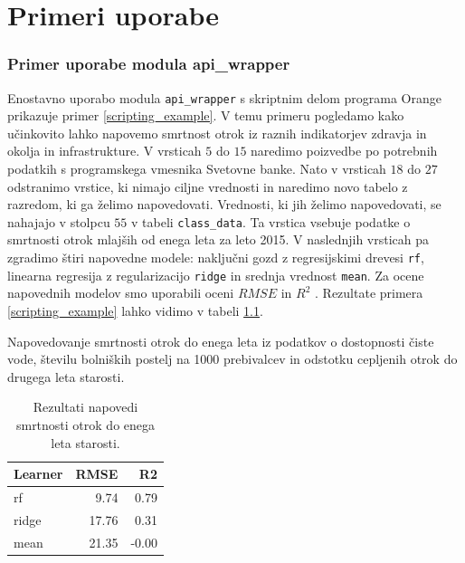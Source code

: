\chapter{Primeri uporabe}




\subsection{Primer uporabe modula api\_wrapper}

Enostavno uporabo modula \verb|api_wrapper| s skriptnim delom programa Orange
prikazuje primer \ref{scripting_example}. V temu primeru pogledamo kako
učinkovito lahko napovemo smrtnost otrok iz raznih indikatorjev zdravja in
okolja in infrastrukture. V vrsticah $5$ do $15$ naredimo poizvedbe po
potrebnih podatkih s programskega vmesnika Svetovne banke. Nato v vrsticah $18$
do $27$ odstranimo vrstice, ki nimajo ciljne vrednosti in naredimo novo tabelo z
razredom, ki ga želimo napovedovati. Vrednosti, ki jih želimo napovedovati, se
nahajajo v stolpcu $55$ v tabeli \verb|class_data|. Ta vrstica vsebuje podatke
o smrtnosti otrok mlajših od enega leta za leto 2015. V naslednjih vrsticah
pa zgradimo štiri napovedne modele: naključni gozd z
regresijskimi drevesi \verb|rf|, linearna regresija z regularizacijo 
\verb|ridge| in srednja vrednost \verb|mean|.
Za ocene napovednih modelov smo uporabili oceni
$RMSE$  in 
$R^2$ .
Rezultate primera \ref{scripting_example} lahko vidimo v tabeli 
\ref{rezultati_skripte}.


\begin{snippet}
\begin{center}

\end{center}
\cprotect
\caption{Napovedovanje smrtnosti otrok do enega leta iz podatkov o dostopnosti
  čiste vode, številu bolniških postelj na 1000 prebivalcev in odstotku
  cepljenih otrok do drugega leta starosti.}
\label{scripting_example}
\end{snippet} 

\begin{table}
\begin{center}

\begin{tabular}{l|r|r}
  Learner & RMSE & R2      \\ \hline
 
  rf & 9.74 & 0.79 \\
  ridge & 17.76 & 0.31 \\
  mean & 21.35 & -0.00

\end{tabular}
\end{center}
\cprotect
\caption{Rezultati napovedi smrtnosti otrok do enega leta starosti.}
\label{rezultati_skripte}
\end{table} 



